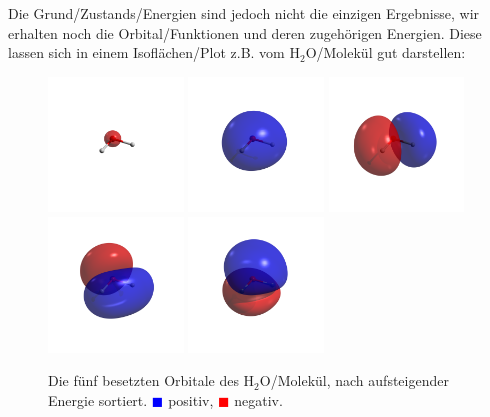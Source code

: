 Die Grund\-/Zustands\-/Energien sind jedoch nicht die einzigen Ergebnisse,
wir erhalten noch die Orbital\-/Funktionen und deren zugehörigen Energien.
Diese lassen sich in einem Isoflächen\-/Plot z.B. vom H$_2$O\-/Molekül gut darstellen:
\begin{figure}[h]
    \centering
\includegraphics[trim=650 650 650 650, clip, width=0.32\textwidth]{res/H2O/h2o_w0.png}
\includegraphics[trim=650 650 650 650, clip, width=0.32\textwidth]{res/H2O/h2o_w1.png}
\includegraphics[trim=650 650 650 650, clip, width=0.32\textwidth]{res/H2O/h2o_w2.png}\\
\includegraphics[trim=650 650 650 650, clip, width=0.32\textwidth]{res/H2O/h2o_w3.png}
\includegraphics[trim=650 650 650 650, clip, width=0.32\textwidth]{res/H2O/h2o_w4.png}
\caption{Die fünf besetzten Orbitale des H$_2$O\-/Molekül,
nach aufsteigender Energie sortiert.
\textcolor{blue}{$\blacksquare$} positiv,
\textcolor{red}{$\blacksquare$} negativ.}\label{h2o_orbitals}
\end{figure}